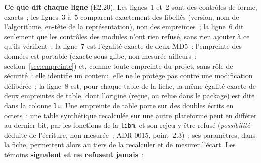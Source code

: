 \documentclass[a4paper,11pt]{article}
\newcommand{\code}[1]{\texttt{\small #1}}
\begin{document}
\noindent
\textbf{Ce que dit chaque ligne} (E2.20). Les lignes~1 et~2 sont des
contrôles de forme, exacts~; les lignes~3 à~5 comparent exactement des
libellés (version, nom de l'algorithme, en-tête de la représentation), non
des empreintes~; la ligne~6 dit seulement que les contrôles des modules
n'ont rien refusé, sans rien ajouter à ce qu'ils vérifient~; la ligne~7 est
l'égalité exacte de deux MD5~: l'empreinte des données est portable (exacte
sous glibc, non mesurée ailleurs~; section~\ref{sec:empreinte}) et, comme
toute empreinte du projet, sans rôle de sécurité~: elle identifie un
contenu, elle ne le protège pas contre une modification délibérée~; la
ligne~8 est, pour chaque table de la fiche, la même égalité exacte de deux
empreintes de table, dont l'origine (reçue, ou relue dans le package) est
dite dans la colonne \code{lu}. Une empreinte de table porte sur des doubles
écrits en octets~: une table synthétique recalculée sur une autre plateforme
peut en différer au dernier bit, par les fonctions de la \code{libm}, et son
rejeu y être refusé (\emph{possibilité} déduite de l'écriture, non
mesurée~; ADR 0015, point~2.3)~; ses paramètres, dans la fiche, permettent
alors au tiers de la recalculer et de mesurer l'écart. Les
témoins \textbf{signalent et ne refusent jamais}~:
\end{document}
